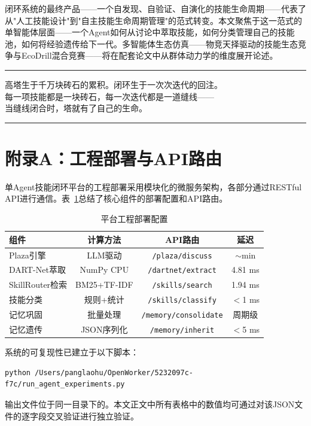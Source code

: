 \documentclass[12pt,a4paper]{ctexart}
\begin{document}
闭环系统的最终产品——一个自发现、自验证、自演化的技能生命周期——代表了从"人工技能设计"到"自主技能生命周期管理"的范式转变。本文聚焦于这一范式的单智能体层面——一个Agent如何从讨论中萃取技能，如何分类管理自己的技能池，如何将经验遗传给下一代。多智能体生态仿真——物竞天择驱动的技能生态竞争与EcoDrill混合竞赛——将在配套论文中从群体动力学的维度展开论述。

\vspace{12pt}
\hrule
\vspace{8pt}

\begin{center}
{\kaishu 高塔生于千万块砖石的累积。闭环生于一次次迭代的回注。\\
每一项技能都是一块砖石，每一次迭代都是一道缝线——\\
当缝线闭合时，塔就有了自己的生命。}
\end{center}

\vspace{8pt}
\hrule
\vspace{12pt}

\section*{附录A：工程部署与API路由}

单Agent技能闭环平台的工程部署采用模块化的微服务架构，各部分通过RESTful API进行通信。表~\ref{tab:deployment}总结了核心组件的部署配置和API路由。

\begin{table}[H]
\centering
\caption{平台工程部署配置}
\label{tab:deployment}
\renewcommand{\arraystretch}{1.2}
\begin{tabular}{lccc}
\toprule
组件 & 计算方法 & API路由 & 延迟 \\
\midrule
Plaza引擎 & LLM驱动 & \texttt{/plaza/discuss} & $\sim$min \\
DART-Net萃取 & NumPy CPU & \texttt{/dartnet/extract} & 4.81 ms \\
SkillRouter检索 & BM25+TF-IDF & \texttt{/skills/search} & 1.94 ms \\
技能分类 & 规则+统计 & \texttt{/skills/classify} & $<$1 ms \\
记忆巩固 & 批量处理 & \texttt{/memory/consolidate} & 周期级 \\
记忆遗传 & JSON序列化 & \texttt{/memory/inherit} & $<$5 ms \\
\bottomrule
\end{tabular}
\end{table}

系统的可复现性已建立于以下脚本：
\begin{verbatim}
python /Users/panglaohu/OpenWorker/5232097c-f7c/run_agent_experiments.py
\end{verbatim}
输出文件位于同一目录下的。本文正文中所有表格中的数值均可通过对该JSON文件的逐字段交叉验证进行独立验证。
\end{document}
